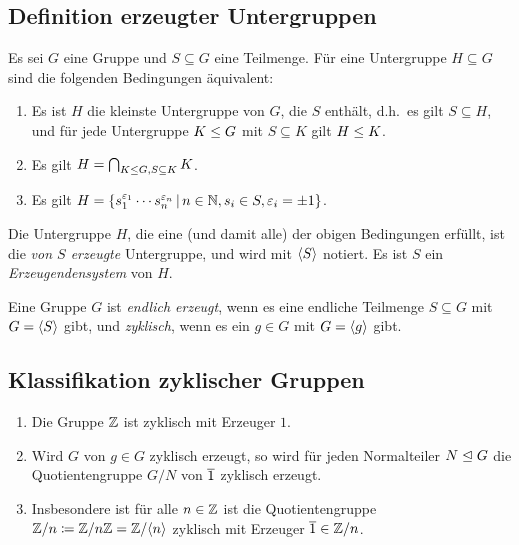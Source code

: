 \subsection{Definition erzeugter Untergruppen}

Es sei $G$ eine Gruppe und $S \subseteq G$ eine Teilmenge.
Für eine Untergruppe $H \subseteq G$ sind die folgenden Bedingungen äquivalent:

\begin{enumerate}
  \item
    Es ist $H$ die kleinste Untergruppe von $G$, die $S$ enthält, d.h.\ es gilt $S \subseteq H$, und für jede Untergruppe $K \mathrel{\leq} G$ mit $S \subseteq K$ gilt $H \mathrel{\leq} K$.
  \item
    Es gilt $H = \bigcap_{K \mathrel{\leq} G, S \subseteq K} K$.
  \item
    Es gilt
    $
        H
      = \{
          s_1^{\varepsilon_1} \dotsm s_n^{\varepsilon_n}
        \suchthat
          n \in \Natural,
          s_i \in S,
          \varepsilon_i = \pm 1
        \}
    $.
\end{enumerate}

\begin{definition}
  Die Untergruppe $H$, die eine \textup(und damit alle\textup) der obigen Bedingungen erfüllt, ist die \emph{von $S$ erzeugte} Untergruppe, und wird mit $\langle S\rangle$ notiert.
  Es ist $S$ ein \emph{Erzeugendensystem} von $H$.
\end{definition}

\begin{definition}
  Eine Gruppe $G$ ist \emph{endlich erzeugt}, wenn es eine endliche Teilmenge $S \subseteq G$ mit $G = \langle S\rangle$ gibt, und \emph{zyklisch}, wenn es ein $g \in G$ mit $G = \langle g\rangle$ gibt.
\end{definition}



\subsection{Klassifikation zyklischer Gruppen}

\begin{example}
  \begin{enumerate}
    \item
      Die Gruppe $\mathbb{Z}$ ist zyklisch mit Erzeuger $1$.
    \item
      Wird $G$ von $g \in G$ zyklisch erzeugt, so wird für jeden Normalteiler $N \mathrel{\trianglelefteq} G$ die Quotientengruppe $G/N$ von $\overline{1}$ zyklisch erzeugt.
    \item
      Insbesondere ist für alle $n \in \mathbb{Z}$ ist die Quotientengruppe $\mathbb{Z}/n \coloneqq \mathbb{Z}/n\mathbb{Z} = \mathbb{Z}/\langle n\rangle$ zyklisch mit Erzeuger $\overline{1} \in \mathbb{Z}/n$.
  \end{enumerate}
\end{example}

